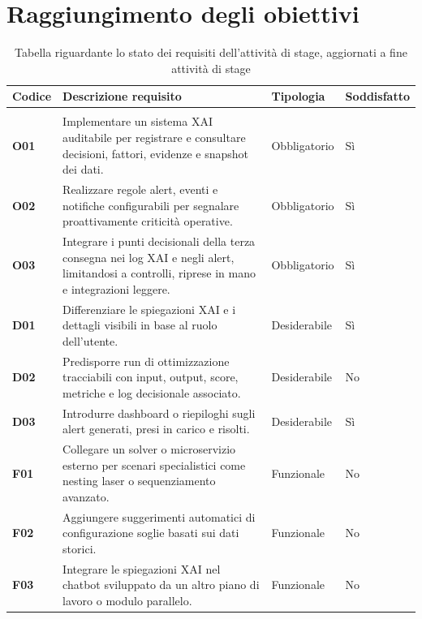 \section{Raggiungimento degli obiettivi}
\begin{center}
    \keepXColumns
        \begin{longtable}{|l|p{}|l|l|}
            \hline
            \rowcolor{gold}
            \textbf{Codice} & \textbf{Descrizione requisito} & \textbf{Tipologia} & \textbf{Soddisfatto}\\
            \hline
            \endhead

            \hline
            \rowcolor{white}
            \caption{Tabella riguardante lo stato dei requisiti dell'attività di stage, aggiornati a fine attività di stage} \label{tab:requisiti_stage_finali} \\
            \endlastfoot 

            \textbf{O01} & Implementare un sistema XAI auditabile per registrare e consultare decisioni, fattori, evidenze e snapshot dei dati. & Obbligatorio & Sì\\
            \hline
            \textbf{O02} & Realizzare regole alert, eventi e notifiche configurabili per segnalare proattivamente criticità operative. & Obbligatorio & Sì\\
            \hline
            \textbf{O03} & Integrare i punti decisionali della terza consegna nei log XAI e negli alert, limitandosi a controlli, riprese in mano e integrazioni leggere. & Obbligatorio & Sì\\
            \hline
            \textbf{D01} & Differenziare le spiegazioni XAI e i dettagli visibili in base al ruolo dell'utente. & Desiderabile & Sì\\
            \hline
            \textbf{D02} & Predisporre run di ottimizzazione tracciabili con input, output, score, metriche e log decisionale associato. & Desiderabile & No\\
            \hline
            \textbf{D03} & Introdurre dashboard o riepiloghi sugli alert generati, presi in carico e risolti. & Desiderabile & Sì\\
            \hline
            \textbf{F01} & Collegare un solver o microservizio esterno per scenari specialistici come nesting laser o sequenziamento avanzato. & Funzionale & No\\
            \hline
            \textbf{F02} & Aggiungere suggerimenti automatici di configurazione soglie basati sui dati storici. & Funzionale & No\\
            \hline
            \textbf{F03} & Integrare le spiegazioni XAI nel chatbot sviluppato da un altro piano di lavoro o modulo parallelo. & Funzionale & No\\
            \hline
        \end{longtable}
\end{center}

